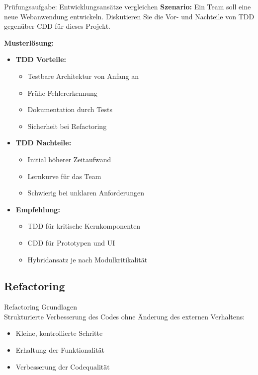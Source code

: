 \begin{example2}{Prüfungsaufgabe: Entwicklungsansätze vergleichen}
\textbf{Szenario:}
Ein Team soll eine neue Webanwendung entwickeln. Diskutieren Sie die Vor- und Nachteile 
von TDD gegenüber CDD für dieses Projekt.

\textbf{Musterlösung:}
\begin{itemize}
    \item \textbf{TDD Vorteile:}
    \begin{itemize}
        \item Testbare Architektur von Anfang an
        \item Frühe Fehlererkennung
        \item Dokumentation durch Tests
        \item Sicherheit bei Refactoring
    \end{itemize}
    
    \item \textbf{TDD Nachteile:}
    \begin{itemize}
        \item Initial höherer Zeitaufwand
        \item Lernkurve für das Team
        \item Schwierig bei unklaren Anforderungen
    \end{itemize}
    
    \item \textbf{Empfehlung:}
    \begin{itemize}
        \item TDD für kritische Kernkomponenten
        \item CDD für Prototypen und UI
        \item Hybridansatz je nach Modulkritikalität
    \end{itemize}
\end{itemize}
\end{example2}

\subsection{Refactoring}

\begin{definition}{Refactoring Grundlagen}\\
Strukturierte Verbesserung des Codes ohne Änderung des externen Verhaltens:
\begin{itemize}
    \item Kleine, kontrollierte Schritte
    \item Erhaltung der Funktionalität
    \item Verbesserung der Codequalität
\end{itemize}
\end{definition}


